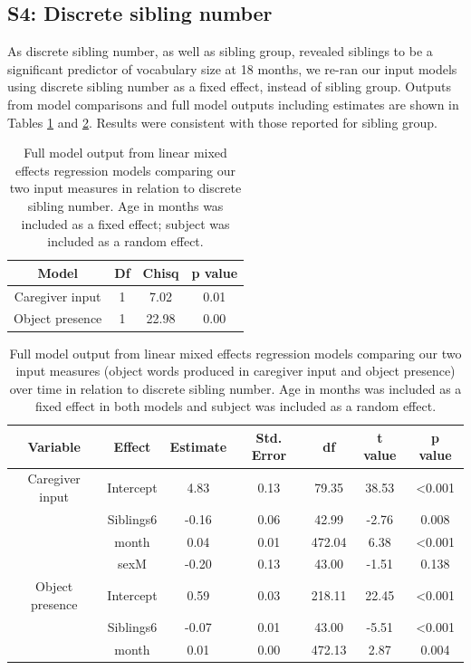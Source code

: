 \documentclass[
  man,floatsintext]{apa6}
\begin{document}
\hypertarget{s4-discrete-sibling-number}{%
\subsection{S4: Discrete sibling number}\label{s4-discrete-sibling-number}}

As discrete sibling number, as well as sibling group, revealed siblings to be a significant predictor of vocabulary size at 18 months, we re-ran our input models using discrete sibling number as a fixed effect, instead of sibling group. Outputs from model comparisons and full model outputs including estimates are shown in Tables \ref{tab:table-model-comparisons-discrete} and \ref{tab:table-input-model-summary-discrete}. Results were consistent with those reported for sibling group.

\begin{longtable}[t]{cccc}
\caption{\label{tab:table-model-comparisons-discrete}Full model output from linear mixed effects regression models comparing our two input measures in relation to discrete sibling number. Age in months was included as a fixed effect; subject was included as a random effect.}\\
\toprule
Model & Df & Chisq & p value\\
\midrule
Caregiver input & 1 & 7.02 & 0.01\\
Object presence & 1 & 22.98 & 0.00\\
\bottomrule
\end{longtable}

\begin{longtable}[t]{ccccccc}
\caption{\label{tab:table-input-model-summary-discrete}Full model output from linear mixed effects regression models comparing our two input measures (object words produced in caregiver input and object presence) over time in relation to discrete sibling number. Age in months was included as a fixed effect in both models and subject was included as a random effect.}\\
\toprule
Variable & Effect & Estimate & Std. Error & df & t value & p value\\
\midrule
Caregiver input & Intercept & 4.83 & 0.13 & 79.35 & 38.53 & <0.001\\
 & Siblings6 & -0.16 & 0.06 & 42.99 & -2.76 & 0.008\\
 & month & 0.04 & 0.01 & 472.04 & 6.38 & <0.001\\
 & sexM & -0.20 & 0.13 & 43.00 & -1.51 & 0.138\\
\midrule
Object presence & Intercept & 0.59 & 0.03 & 218.11 & 22.45 & <0.001\\
\addlinespace
 & Siblings6 & -0.07 & 0.01 & 43.00 & -5.51 & <0.001\\
 & month & 0.01 & 0.00 & 472.13 & 2.87 & 0.004\\
\bottomrule
\end{longtable}
\end{document}
